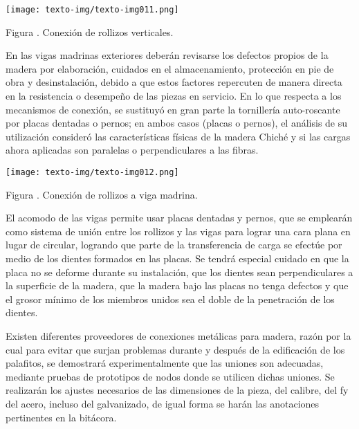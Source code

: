 \documentclass{article}
\newcounter{Figura}
\renewcommand\theFigura{\arabic{Figura}}
\begin{document}
\bigskip


\bigskip

 \texttt{[image: texto-img/texto-img011.png]} 

Figura \stepcounter{Figura}{\theFigura}. Conexión de rollizos verticales.


\bigskip


\bigskip

En las vigas madrinas exteriores deberán revisarse los defectos propios de la madera por elaboración, cuidados en el almacenamiento, protección en pie de obra y desinstalación, debido a que estos factores repercuten de manera directa en la resistencia o desempeño de las piezas en servicio. En lo que respecta a los mecanismos de conexión, se sustituyó en gran parte la tornillería auto-roscante por placas dentadas o pernos; en ambos casos (placas o pernos), el análisis de su utilización consideró las características físicas de la madera Chiché y si las cargas ahora aplicadas son paralelas o perpendiculares a las fibras.


\bigskip

 \texttt{[image: texto-img/texto-img012.png]} 

Figura \stepcounter{Figura}{\theFigura}. Conexión de rollizos a viga madrina.


\bigskip


\bigskip

El acomodo de las vigas permite usar placas dentadas y pernos, que se emplearán como sistema de unión entre los rollizos y las vigas para lograr una cara plana en lugar de circular, logrando que parte de la transferencia de carga se efectúe por medio de los dientes formados en las placas. Se tendrá especial cuidado en que la placa no se deforme durante su instalación, que los dientes sean perpendiculares a la superficie de la madera, que la madera bajo las placas no tenga defectos y que el grosor mínimo de los miembros unidos sea el doble de la penetración de los dientes.

Existen diferentes proveedores de conexiones metálicas para madera, razón por la cual para evitar que surjan problemas durante y después de la edificación de los palafitos, se demostrará experimentalmente que las uniones son adecuadas, mediante pruebas de prototipos de nodos donde se utilicen dichas uniones. Se realizarán los ajustes necesarios de las dimensiones de la pieza, del calibre, del fy del acero, incluso del galvanizado, de igual forma se harán las anotaciones pertinentes en la bitácora.


\bigskip
\end{document}
